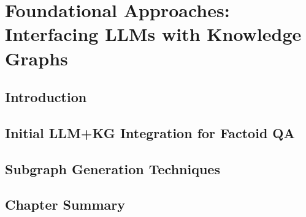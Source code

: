 \chapter{Foundational Approaches: Interfacing LLMs with Knowledge Graphs}
\label{ch:foundations}

\section{Introduction}
\label{sec:foundations:intro}

\section{Initial LLM+KG Integration for Factoid QA}
\label{sec:foundations:llmkg_initial}

\section{Subgraph Generation Techniques}
\label{sec:foundations:subgraphs}

\section{Chapter Summary}
\label{sec:foundations:summary}

